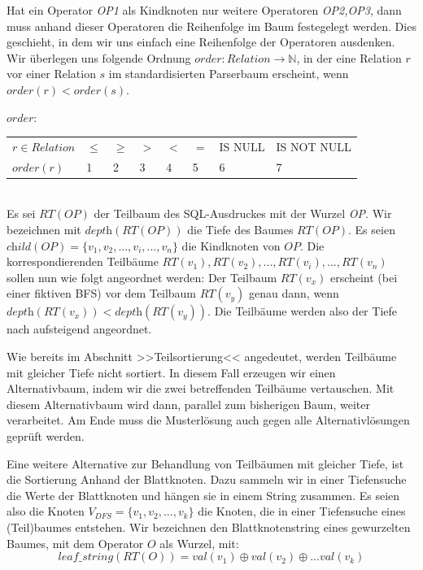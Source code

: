 Hat ein Operator \textit{OP1} als Kindknoten nur weitere Operatoren \textit{OP2,OP3}, dann muss anhand dieser Operatoren die Reihenfolge im Baum festegelegt werden. Dies geschieht, in dem wir uns einfach eine Reihenfolge der Operatoren ausdenken. Wir überlegen uns folgende Ordnung $order:\textit{Relation}\to\mathbb{N}$, in der eine Relation $r$ vor einer Relation $s$ im standardisierten Parserbaum erscheint, wenn $order(r) < order(s)$.

$order:$\\

\begin{tabular}{|llllllll|}
\hline
$r\in \textit{Relation}$ & $\le$ & $\ge$ & $>$ & $<$ & $=$ & IS NULL & IS NOT NULL  \\
$\textit{order}(r)$ & 1 & 2 & 3 & 4 & 5 & 6 & 7\\ 
\hline
\end{tabular}\\

Es sei $\textit{RT}(\textit{OP})$ der Teilbaum des SQL-Ausdruckes mit der Wurzel \textit{OP}. Wir bezeichnen mit $\textit{depth}(\textit{RT}(\textit{OP}))$ die Tiefe des Baumes $\textit{RT}(\textit{OP})$. Es seien $\textit{child}(\textit{OP}) = \{v_1,v_2,...,v_i,...,v_n\}$ die Kindknoten von $\textit{OP}$. Die korrespondierenden Teilbäume $\textit{RT}(v_1),\textit{RT}(v_2),...,\textit{RT}(v_i),...,\textit{RT}(v_n)$ sollen nun wie folgt angeordnet werden: Der Teilbaum $\textit{RT}(v_x)$ erscheint (bei einer fiktiven BFS) vor dem Teilbaum $\textit{RT}(v_y)$ genau dann, wenn $\textit{depth}(\textit{RT}(v_x)) <  \textit{depth}(\textit{RT}(v_y))$. Die Teilbäume werden also der Tiefe nach aufsteigend angeordnet. 

Wie bereits im Abschnitt >>Teilsortierung<< angedeutet, werden Teilbäume mit gleicher Tiefe nicht sortiert. In diesem Fall erzeugen wir einen Alternativbaum, indem wir die zwei betreffenden Teilbäume vertauschen. Mit diesem Alternativbaum wird dann, parallel zum bisherigen Baum, weiter verarbeitet. Am Ende muss die Musterlösung auch gegen alle Alternativlösungen geprüft werden.

Eine weitere Alternative zur Behandlung von Teilbäumen mit gleicher Tiefe, ist die Sortierung Anhand der Blattknoten. Dazu sammeln wir in einer Tiefensuche die Werte der Blattknoten und hängen sie in einem String zusammen. Es seien also die Knoten $V_{DFS} = \{v_1,v_2,...,v_k\}$ die Knoten, die in einer Tiefensuche eines (Teil)baumes entstehen. Wir bezeichnen den Blattknotenstring eines gewurzelten Baumes, mit dem Operator $O$ als Wurzel, mit: $$\mathit{leaf\_string}(RT(O)) = \mathit{val}(v_1) \oplus \mathit{val}(v_2) \oplus ... \mathit{val}(v_k)$$

